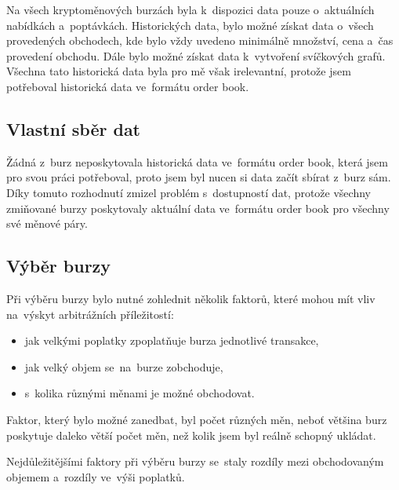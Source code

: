 \documentclass[thesis=B,czech]{FITthesis}[2019/03/21]
\begin{document}
Na všech kryptoměnových burzách byla k~dispozici data pouze o~aktuálních nabídkách a~poptávkách. Historických data, bylo možné získat data o~všech provedených obchodech, kde bylo vždy uvedeno minimálně množství, cena a~čas provedení obchodu. Dále bylo možné získat data k~vytvoření svíčkových grafů. Všechna tato historická data byla pro mě však irelevantní, protože jsem potřeboval historická data ve~formátu order book.

\subsection{Vlastní sběr dat}
Žádná z~burz neposkytovala historická data ve~formátu order book, která jsem pro svou práci potřeboval, proto jsem byl nucen si data začít sbírat z~burz sám. Díky tomuto rozhodnutí zmizel problém s~dostupností dat, protože všechny zmiňované burzy poskytovaly aktuální data ve~formátu order book pro všechny své měnové páry.

\subsection{Výběr burzy}
Při výběru burzy bylo nutné zohlednit několik faktorů, které mohou mít vliv na~výskyt arbitrážních příležitostí: 
\begin{itemize}
    \item jak velkými poplatky zpoplatňuje burza jednotlivé transakce,
    \item jak velký objem se~na~burze zobchoduje,
    \item s~kolika různými měnami je možné obchodovat.
\end{itemize}
Faktor, který bylo možné zanedbat, byl počet různých měn, neboť většina burz poskytuje daleko větší počet měn, než kolik jsem byl reálně schopný ukládat. 

Nejdůležitějšími faktory při výběru burzy se~staly rozdíly mezi obchodovaným objemem a~rozdíly ve~výši poplatků.
\end{document}
